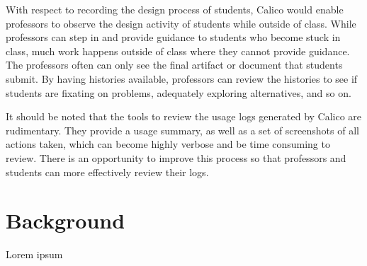 \documentclass[12pt,fleqn]{ucithesis}
\begin{document}
With respect to recording the design process of students, Calico would enable professors to observe the design activity of students while outside of class. While professors can step in and provide guidance to students who become stuck in class, much work happens outside of class where they cannot provide guidance. The professors often can only see the final artifact or document that students submit. By having histories available, professors can review the histories to see if students are fixating on problems, adequately exploring alternatives, and so on.

It should be noted that the tools to review the usage logs generated by Calico are rudimentary. They provide a usage summary, as well as a set of screenshots of all actions taken, which can become highly verbose and be time consuming to review. There is an opportunity to improve this process so that professors and students can more effectively review their logs.

 \newpage 
\label{chapter:future-work}


\section{Background}

Lorem ipsum 

 \newpage 

\clearpage
{}




\captionsetup[figure]{list=no}
\captionsetup[table]{list=no}
\end{document}
